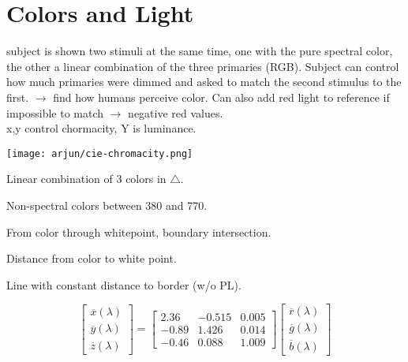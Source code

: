 \section{Colors and Light}
 subject is shown two stimuli at the same time, one with the pure spectral color, the other a linear combination of the three primaries (RGB). Subject can control how much primaries were dimmed and asked to match the second stimulus to the first. $\rightarrow$ find how humans perceive color. Can also add red light to reference if impossible to match $\rightarrow$ negative red values. \\
 x,y control chormacity, Y is luminance. \\
\vspace{-10pt}
\begin{minipage}{0.4\columnwidth}
    \texttt{[image: arjun/cie-chromacity.png]}
\end{minipage}%
\begin{minipage}{0.6\columnwidth}
       Linear combination of 3 colors in \(\triangle\).

      Non-spectral colors between 380 and 770.

      From color through whitepoint, boundary intersection.

      Distance from color to white point.

      Line with constant distance to border (w/o PL).
\end{minipage}
  \vspace{10pt}

  \[\begin{bmatrix}
    \overline{x}(\lambda) \\ \overline{y}(\lambda) \\ \overline{z}(\lambda)
  \end{bmatrix} = \begin{bmatrix}
    2.36 & -0.515 & 0.005 \\ -0.89 & 1.426 & 0.014 \\ -0.46 & 0.088 & 1.009
  \end{bmatrix} \begin{bmatrix}
    \overline{r}(\lambda) \\ \overline{g}(\lambda) \\ \overline{b}(\lambda)
  \end{bmatrix}\]


